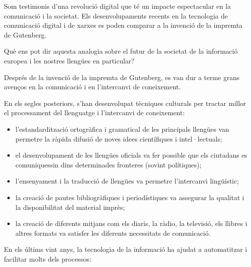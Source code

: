 \begin{multicols}{2}
Som testimonis d’una revolució digital que té un impacte espectacular en la comunicació i la societat. Els desenvolupaments recents en la tecnologia de comunicació digital i de xarxes es poden comparar a la invenció de la impremta de Gutenberg.


Què ens pot dir aquesta analogia sobre el futur de la societat de la informació europea i les nostres llengües en particular?

Després de la invenció de la impremta de Gutenberg, es van dur a terme grans avenços en la comunicació i en l’intercanvi de coneixement.

En els segles posteriors, s’han desenvolupat tècniques culturals per tractar millor el processament del llenguatge i l’intercanvi de coneixement: 

\begin{itemize}
\item l’estandardització ortogràfica i gramatical de les principals llengües van permetre la ràpida difusió de noves idees científiques i intel·lectuals;
\item el desenvolupament de les llengües oficials va fer possible que els ciutadans es comuniquessin dins determinades fronteres (sovint polítiques);
\item l’ensenyament i la traducció de llengües va permetre l’intercanvi lingüístic;
\item la creació de pautes bibliogràfiques i periodístiques va assegurar la qualitat i la disponibilitat del material imprès;
\item la creació de diferents mitjans com els diaris, la ràdio, la televisió, els llibres i altres formats va satisfer les diferents necessitats de comunicació. 
\end{itemize}

En els últims vint anys, la tecnologia de la informació ha ajudat a automatitzar i facilitar molts dels processos:


\end{multicols}
